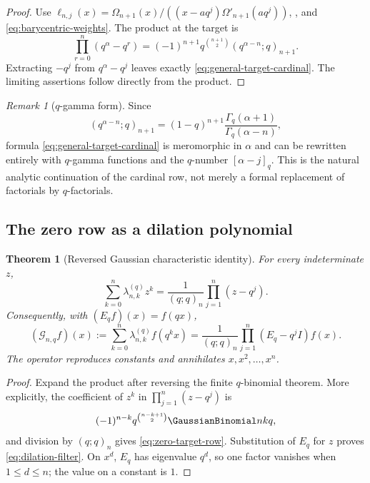 \documentclass[11pt,a4paper,oneside]{article}
\newtheorem{theorem}{Theorem}[section]
\theoremstyle{definition}
\theoremstyle{remark}
\newtheorem{remark}[remark]{Remark}
\newcommand{\Gop}{\mathcal G}
\begin{document}
\begin{proof}
Use
$\ell_{n,j}(x)=\Omega_{n+1}(x)/((x-aq^j)\Omega'_{n+1}(aq^j))$,
, and \eqref{eq:barycentric-weights}.  The product
at the target is
\[
 \prod_{r=0}^n(q^\alpha-q^r)
 =(-1)^{n+1}q^{\binom{n+1}{2}}(q^{\alpha-n};q)_{n+1}.
\]
Extracting $-q^j$ from $q^\alpha-q^j$ leaves exactly
\eqref{eq:general-target-cardinal}.  The limiting assertions follow directly
from the product.
\end{proof}

\begin{remark}[$q$-gamma form]
Since
\[
 (q^{\alpha-n};q)_{n+1}
 =(1-q)^{n+1}\frac{\Gamma_q(\alpha+1)}{\Gamma_q(\alpha-n)},
\]
formula \eqref{eq:general-target-cardinal} is meromorphic in $\alpha$ and can
be rewritten entirely with $q$-gamma functions and the $q$-number
$[\alpha-j]_q$.  This is the natural analytic continuation of the cardinal
row, not merely a formal replacement of factorials by $q$-factorials.
\end{remark}

\subsection{The zero row as a dilation polynomial}

\begin{theorem}[Reversed Gaussian characteristic identity]
\label{thm:filter-characteristic}
For every indeterminate $z$,
\begin{equation}
 \sum_{k=0}^n\lambda_{n,k}^{(q)}z^k
 =\frac1{(q;q)_n}\prod_{j=1}^n(z-q^j).
 \label{eq:lambda-characteristic}
\end{equation}
Consequently, with $(E_qf)(x)=f(qx)$,
\begin{equation}
 (\Gop_{n,q}f)(x)
 :=\sum_{k=0}^n\lambda_{n,k}^{(q)}f(q^kx)
 =\frac1{(q;q)_n}\prod_{j=1}^n(E_q-q^jI)f(x).
 \label{eq:dilation-filter}
\end{equation}
The operator reproduces constants and annihilates $x,x^2,\ldots,x^n$.
\end{theorem}

\begin{proof}
Expand the product after reversing the finite $q$-binomial theorem.  More
explicitly, the coefficient of $z^k$ in
$\prod_{j=1}^n(z-q^j)$ is
\[
 (-1)^{n-k}q^{\binom{n-k+1}{2}}\GaussianBinomial nkq,
\]
and division by $(q;q)_n$ gives \eqref{eq:zero-target-row}.  Substitution of
$E_q$ for $z$ proves \eqref{eq:dilation-filter}.  On $x^d$, $E_q$ has
eigenvalue $q^d$, so one factor vanishes when $1\le d\le n$; the value on a
constant is $1$.
\end{proof}
\end{document}
